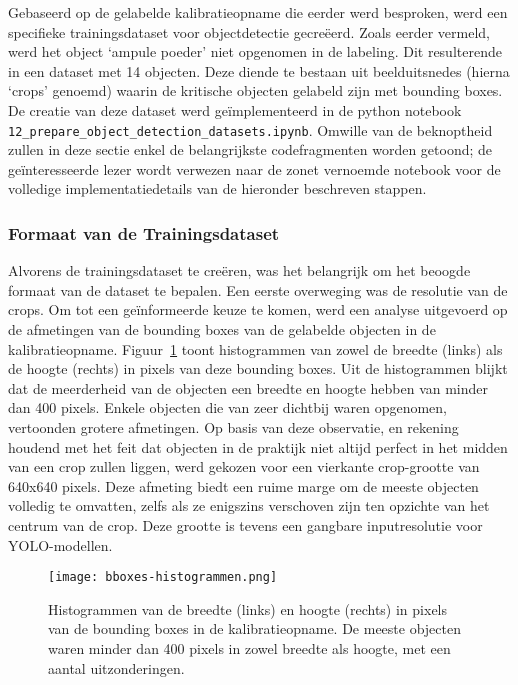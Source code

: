 Gebaseerd op de gelabelde kalibratieopname die eerder werd besproken, werd een specifieke trainingsdataset voor objectdetectie gecreëerd.
Zoals eerder vermeld, werd het object `ampule poeder' niet opgenomen in de labeling. Dit resulterende in een dataset met 14 objecten.
Deze diende te bestaan uit beelduitsnedes (hierna `crops' genoemd) waarin de kritische objecten gelabeld zijn met bounding boxes.
De creatie van deze dataset werd geïmplementeerd in de python notebook \texttt{12\_prepare\_object\_detection\_datasets.ipynb}.
Omwille van de beknoptheid zullen in deze sectie enkel de belangrijkste codefragmenten worden getoond; 
de geïnteresseerde lezer wordt verwezen naar de zonet vernoemde notebook voor de volledige implementatiedetails van de hieronder beschreven stappen.

\subsubsection{Formaat van de Trainingsdataset}

Alvorens de trainingsdataset te creëren, was het belangrijk om het beoogde formaat van de dataset te bepalen.
Een eerste overweging was de resolutie van de crops. 
Om tot een geïnformeerde keuze te komen, werd een analyse uitgevoerd op de afmetingen van de bounding boxes 
van de gelabelde objecten in de kalibratieopname. 
Figuur~\ref{fig:size-histogram} toont histogrammen van zowel de breedte (links) als de hoogte (rechts) 
in pixels van deze bounding boxes. 
Uit de histogrammen blijkt dat de meerderheid van de objecten een breedte en hoogte hebben van minder dan 400 pixels. 
Enkele objecten die van zeer dichtbij waren opgenomen, vertoonden grotere afmetingen. 
Op basis van deze observatie, en rekening houdend met het feit dat objecten in de praktijk 
niet altijd perfect in het midden van een crop zullen liggen, 
werd gekozen voor een vierkante crop-grootte van 640x640 pixels. 
Deze afmeting biedt een ruime marge om de meeste objecten volledig te omvatten, zelfs als ze enigszins 
verschoven zijn ten opzichte van het centrum van de crop. 
Deze grootte is tevens een gangbare inputresolutie voor YOLO-modellen.

\begin{figure}[H]
    \centering
    \texttt{[image: bboxes-histogrammen.png]}
    \caption[Histogrammen van de breedte en grootte van bounding boxes in de kalibratieopname]{
      \label{fig:size-histogram}
      Histogrammen van de breedte (links) en hoogte (rechts) in pixels van de bounding boxes in de kalibratieopname.
      De meeste objecten waren minder dan 400 pixels in zowel breedte als hoogte, met een aantal uitzonderingen.
    }
\end{figure}

